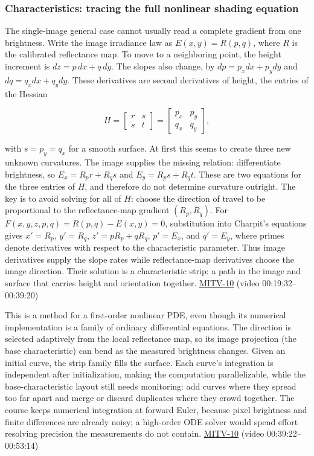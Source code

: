 \subsubsection{Characteristics: tracing the full nonlinear shading equation}\label{characteristics-tracing-the-full-nonlinear-shading-equation}

The single-image general case cannot usually read a complete gradient from one brightness. Write the image irradiance law as \(E(x,y)=R(p,q)\), where \(R\) is the calibrated reflectance map. To move to a neighboring point, the height increment is \(dz=p\,dx+q\,dy\). The slopes also change, by \(dp=p_xdx+p_ydy\) and \(dq=q_xdx+q_ydy\). These derivatives are second derivatives of height, the entries of the Hessian

\[
H=\begin{bmatrix}r&s\\s&t\end{bmatrix}=\begin{bmatrix}p_x&p_y\\q_x&q_y\end{bmatrix},
\]

with \(s=p_y=q_x\) for a smooth surface. At first this seems to create three new unknown curvatures. The image supplies the missing relation: differentiate brightness, so \(E_x=R_p r+R_qs\) and \(E_y=R_ps+R_qt\). These are two equations for the three entries of \(H\), and therefore do not determine curvature outright. The key is to avoid solving for all of \(H\): choose the direction of travel to be proportional to the reflectance-map gradient \((R_p,R_q)\). For \(F(x,y,z,p,q)=R(p,q)-E(x,y)=0\), substitution into Charpit's equations gives \(x'=R_p\), \(y'=R_q\), \(z'=pR_p+qR_q\), \(p'=E_x\), and \(q'=E_y\), where primes denote derivatives with respect to the characteristic parameter. Thus image derivatives supply the slope rates while reflectance-map derivatives choose the image direction. Their solution is a characteristic strip: a path in the image and surface that carries height and orientation together. \hyperref[04-visual-computing-ii-ch036]{MITV-10} (video 00:19:32--00:39:20)

This is a method for a first-order nonlinear PDE, even though its numerical implementation is a family of ordinary differential equations. The direction is selected adaptively from the local reflectance map, so its image projection (the base characteristic) can bend as the measured brightness changes. Given an initial curve, the strip family fills the surface. Each curve's integration is independent after initialization, making the computation parallelizable, while the base-characteristic layout still needs monitoring: add curves where they spread too far apart and merge or discard duplicates where they crowd together. The course keeps numerical integration at forward Euler, because pixel brightness and finite differences are already noisy; a high-order ODE solver would spend effort resolving precision the measurements do not contain. \hyperref[04-visual-computing-ii-ch036]{MITV-10} (video 00:39:22--00:53:14)

